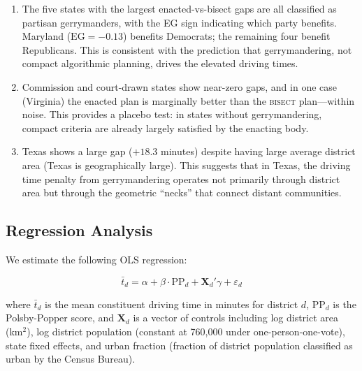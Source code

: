 \begin{enumerate}
\item The five states with the largest enacted-vs-bisect gaps are all classified as
  partisan gerrymanders, with the EG sign indicating which party benefits. Maryland
  ($\text{EG} = -0.13$) benefits Democrats; the remaining four benefit Republicans.
  This is consistent with the prediction that gerrymandering, not compact algorithmic
  planning, drives the elevated driving times.

\item Commission and court-drawn states show near-zero gaps, and in one case (Virginia)
  the enacted plan is marginally better than the \textsc{bisect} plan---within noise.
  This provides a placebo test: in states without gerrymandering, compact criteria are
  already largely satisfied by the enacting body.

\item Texas shows a large gap ($+18.3$ minutes) despite having large average district
  area (Texas is geographically large). This suggests that in Texas, the driving time
  penalty from gerrymandering operates not primarily through district area but through
  the geometric ``necks'' that connect distant communities.
\end{enumerate}

\subsection{Regression Analysis}

We estimate the following OLS regression:

\begin{equation}
\bar{t}_d = \alpha + \beta \cdot \text{PP}_d + \mathbf{X}_d'\gamma + \varepsilon_d
\label{eq:regression}
\end{equation}

where $\bar{t}_d$ is the mean constituent driving time in minutes for district $d$,
$\text{PP}_d$ is the Polsby-Popper score, and $\mathbf{X}_d$ is a vector of controls
including log district area (km$^2$), log district population (constant at 760,000 under
one-person-one-vote), state fixed effects, and urban fraction (fraction of district
population classified as urban by the Census Bureau).


